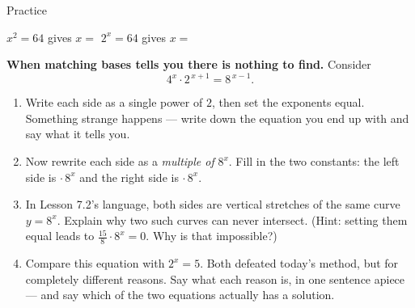 \documentclass[10pt]{article}
\begin{document}
\begin{notesbox}{Practice}
\begin{enumerate}[leftmargin=1.9em, itemsep=12pt]
    \vspace{3pt}
    \hspace*{1.2em} $x^{2}=64$ \; gives $x=$  \hfill
    $2^{x}=64$ \; gives $x=$ 

    \vspace{2pt}
\end{enumerate}
\end{notesbox}

\begin{extensionbox}
\textbf{When matching bases tells you there is nothing to find.} Consider
\[
  4^{x}\cdot 2^{\,x+1} = 8^{\,x-1}.
\]
\begin{enumerate}[label=(\alph*), leftmargin=1.8em, itemsep=5pt]
  \item Write each side as a single power of $2$, then set the exponents equal. Something strange
        happens --- write down the equation you end up with and say what it tells you.
  \item Now rewrite each side as a \emph{multiple of} $8^{x}$. Fill in the two constants:
        the left side is  $\cdot\,8^{x}$ and the right side is 
        $\cdot\,8^{x}$.
  \item In Lesson 7.2's language, both sides are vertical stretches of the same curve $y=8^{x}$.
        Explain why two such curves can never intersect. (Hint: setting them equal leads to
        $\frac{15}{8}\cdot 8^{x}=0$. Why is that impossible?)
  \item Compare this equation with $2^{x}=5$. Both defeated today's method, but for completely
        different reasons. Say what each reason is, in one sentence apiece --- and say which of the
        two equations actually has a solution.
\end{enumerate}
\end{extensionbox}
\end{document}
